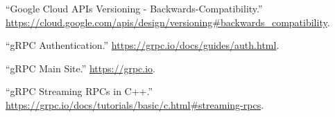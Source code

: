 \documentclass[11pt]{article}
\begin{document}
{{\begin{thebibliography}{38}
\mdbibitemlabel{{}[7]}\textquotedblleft{}Google Cloud APIs Versioning - Backwards-Compatibility.\textquotedblright{} \href{https://cloud.google.com/apis/design/versioning\%23backwards_compatibility}{{\ttfamily https://\hspace{0pt}cloud.\hspace{0pt}google.\hspace{0pt}com/\hspace{0pt}apis/\hspace{0pt}design/\hspace{0pt}versioning\#\hspace{0pt}backwards\_\hspace{0pt}compatibility}}.\label{apiversioningbackwardscompatibility}%

\mdbibitemlabel{{}[8]}\textquotedblleft{}gRPC Authentication.\textquotedblright{} \href{https://grpc.io/docs/guides/auth.html}{{\ttfamily https://\hspace{0pt}grpc.\hspace{0pt}io/\hspace{0pt}docs/\hspace{0pt}guides/\hspace{0pt}auth.\hspace{0pt}html}}.\label{grpcauth}%

\mdbibitemlabel{{}[9]}\textquotedblleft{}gRPC Main Site.\textquotedblright{} \href{https://grpc.io}{{\ttfamily https://\hspace{0pt}grpc.\hspace{0pt}io}}.\label{grpc}%

\mdbibitemlabel{{}[10]}\textquotedblleft{}gRPC Streaming RPCs in C++.\textquotedblright{} \href{https://grpc.io/docs/tutorials/basic/c.html\%23streaming-rpcs}{{\ttfamily https://\hspace{0pt}grpc.\hspace{0pt}io/\hspace{0pt}docs/\hspace{0pt}tutorials/\hspace{0pt}basic/\hspace{0pt}c.\hspace{0pt}html\#\hspace{0pt}streaming-\hspace{0pt}rpcs}}.\label{grpcstreamc}%


\end{thebibliography}}}
\end{document}
